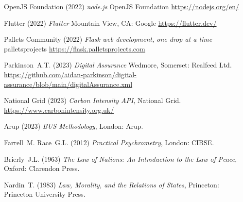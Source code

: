 \documentclass[11pt, oneside]{book}   	%
\begin{document}
\begin{thebibliography}{99}
 OpenJS Foundation (2022)
\emph{node.js}
OpenJS Foundation
\url{https://nodejs.org/en/}

 Flutter (2022)
\emph{Flutter}
Mountain View, CA: Google 
\url{https://flutter.dev/}

 Pallets Community (2022)
\emph{Flask web development, one drop at a time}
palletsprojects
\url{https://flask.palletsprojects.com}

 Parkinson~A.T. (2023)
\emph{Digital Assurance}
Wedmore, Somerset: Realfeed Ltd.
\url{https://github.com/aidan-parkinson/digital-assurance/blob/main/digitalAssurance.xml}

 National Grid (2023)
\emph{Carbon Intensity API},
National Grid.
\url{https://www.carbonintensity.org.uk/}

 Arup (2023)
\emph{BUS Methodology},
London: Arup.

 Farrell~M. Race~G.L. (2012)
\emph{Practical Psychrometry},
London: CIBSE.

 Brierly~J.L. (1963)
\emph{The Law of Nations: An Introduction to the Law of Peace},
Oxford: Clarendon Press.

 Nardin~T. (1983)
\emph{Law, Morality, and the Relations of States},
Princeton: Princeton University Press.

\end{thebibliography}

\newpage
\thispagestyle{empty}
\mbox{}
\newpage
\end{document}

